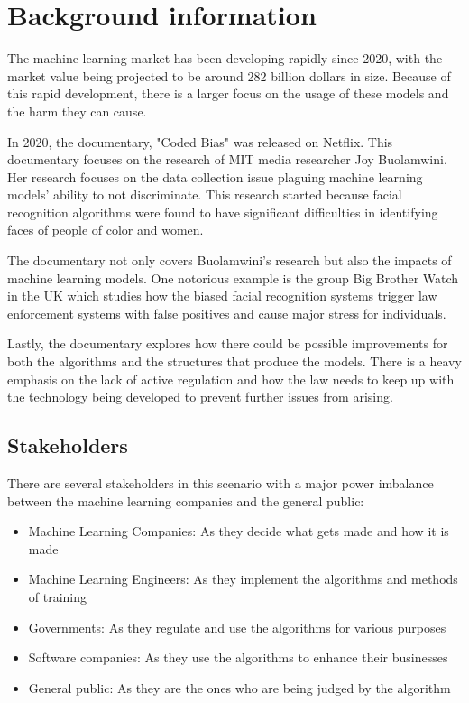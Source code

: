 \section{Background information}
The machine learning market has been developing rapidly since 2020, with the market value being projected to be around 282 billion dollars in size. Because of this rapid development, there is a larger focus on the usage of these models and the harm they can cause.

In 2020, the documentary, "Coded Bias" was released on Netflix. This documentary focuses on the research of MIT media researcher Joy Buolamwini. Her research focuses on the data collection issue plaguing machine learning models' ability to not discriminate. This research started because facial recognition algorithms were found to have significant difficulties in identifying faces of people of color and women. \cite{CodedBias}

The documentary not only covers Buolamwini's research but also the impacts of machine learning models. One notorious example is the group Big Brother Watch in the UK which studies how the biased facial recognition systems trigger law enforcement systems with false positives and cause major stress for individuals. \cite{BigBrotherWatch}

Lastly, the documentary explores how there could be possible improvements for both the algorithms and the structures that produce the models. There is a heavy emphasis on the lack of active regulation and how the law needs to keep up with the technology being developed to prevent further issues from arising. \cite{LegalDefenseFund}

\subsection{Stakeholders}
There are several stakeholders in this scenario with a major power imbalance between the machine learning companies and the general public:

\begin{itemize}
	\item Machine Learning Companies: As they decide what gets made and how it is made
	\item Machine Learning Engineers: As they implement the algorithms and methods of training
	\item Governments: As they regulate and use the algorithms for various purposes
	\item Software companies: As they use the algorithms to enhance their businesses
	\item General public: As they are the ones who are being judged by the algorithm
\end{itemize}

